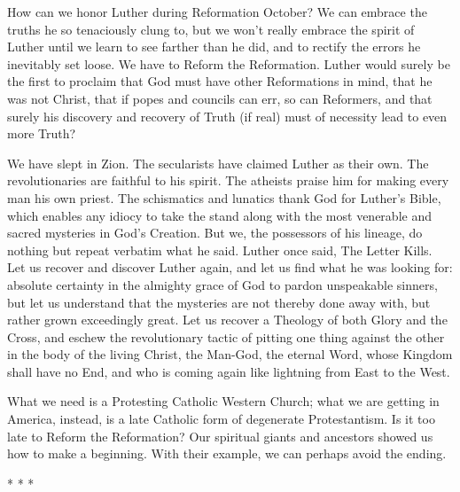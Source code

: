 How can we honor Luther during Reformation October? We can embrace the truths he so tenaciously clung to, but we won't really embrace the spirit of Luther until we learn to see farther than he did, and to rectify the errors he inevitably set loose. We have to Reform the Reformation. Luther would surely be the first to proclaim that God must have other Reformations in mind, that he was not Christ, that if popes and councils can err, so can Reformers, and that surely his discovery and recovery of Truth (if real) must of necessity lead to even more Truth?

We have slept in Zion. The secularists have claimed Luther as their own. The revolutionaries are faithful to his spirit. The atheists praise him for making every man his own priest. The schismatics and lunatics thank God for Luther's Bible, which enables any idiocy to take the stand along with the most venerable and sacred mysteries in God's Creation. But we, the possessors of his lineage, do nothing but repeat verbatim what he said. Luther once said, The Letter Kills. Let us recover and discover Luther again, and let us find what he was looking for: absolute certainty in the almighty grace of God to pardon unspeakable sinners, but let us understand that the mysteries are not thereby done away with, but rather grown exceedingly great. Let us recover a Theology of both Glory and the Cross, and eschew the revolutionary tactic of pitting one thing against the other in the body of the living Christ, the Man-God, the eternal Word, whose Kingdom shall have no End, and who is coming again like lightning from East to the West.

What we need is a Protesting Catholic Western Church; what we are getting in America, instead, is a late Catholic form of degenerate Protestantism. Is it too late to Reform the Reformation? Our spiritual giants and ancestors showed us how to make a beginning. With their example, we can perhaps avoid the ending.



\begin{center}* * *\end{center}

